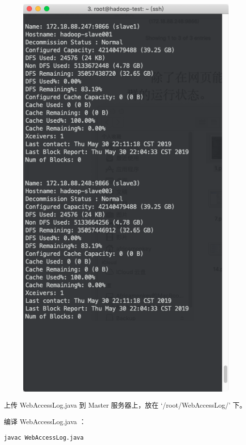 \documentclass{article}
\begin{document}
\begin{figure}[!ht]
\includegraphics[scale=0.38]{image/2.png}
\end{figure}

上传 WebAccessLog.java 到 Master 服务器上，放在 `/root/WebAccessLog/' 下。

编译 WebAccessLog.java ：

\begin{lstlisting}[language=bash]
javac WebAccessLog.java
\end{lstlisting}
\end{document}
